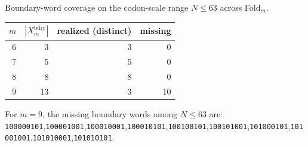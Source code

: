 Boundary-word coverage on the codon-scale range $N\le 63$ across Fold$_m$.

\begin{center}
\small
\setlength{\tabcolsep}{6pt}
\renewcommand{\arraystretch}{1.15}
\begin{tabular}{r r r r}
\toprule
$m$ & $|X_m^{\mathrm{bdry}}|$ & realized (distinct) & missing \\
\midrule
6 & 3 & 3 & 0 \\
7 & 5 & 5 & 0 \\
8 & 8 & 8 & 0 \\
9 & 13 & 3 & 10 \\
\bottomrule
\end{tabular}
\end{center}

For $m=9$, the missing boundary words among $N\le 63$ are: \texttt{100000101},\allowbreak \texttt{100001001},\allowbreak \texttt{100010001},\allowbreak \texttt{100010101},\allowbreak \texttt{100100101},\allowbreak \texttt{100101001},\allowbreak \texttt{101000101},\allowbreak \texttt{101001001},\allowbreak \texttt{101010001},\allowbreak \texttt{101010101}.

